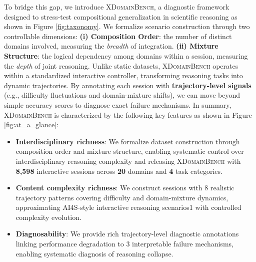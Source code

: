 To bridge this gap, we introduce \textsc{XDomainBench}, a diagnostic framework designed to stress-test compositional generalization in scientific reasoning as shown in Figure \ref{fig:taxonomy}.
We formalize scenario construction through two controllable dimensions: 
\textbf{(i) Composition Order}: the number of distinct domains involved, measuring the \textit{breadth} of integration.
\textbf{(ii) Mixture Structure}: the logical dependency among domains within a session, measuring the \textit{depth} of joint reasoning.
Unlike static datasets, \textsc{XDomainBench} operates within a standardized interactive controller, transforming reasoning tasks into dynamic trajectories.
% 
By annotating each session with \textbf{trajectory-level signals} (e.g., difficulty fluctuations and domain-mixture shifts), we can move beyond simple accuracy scores to diagnose exact failure mechanisms. 
In summary, \textsc{XDomainBench} is characterized by the following key features as shown in Figure \ref{fig:at_a_glance}:
\begin{itemize}
    \item \textbf{Interdisciplinary richness}: We formalize dataset construction through composition order and mixture structure, enabling systematic control over interdisciplinary reasoning complexity and releasing \textsc{XDomainBench} with \textbf{8,598} interactive sessions across \textbf{20} domains and \textbf{4} task categories.
    \item \textbf{Content complexity richness}: We construct sessions with 8 realistic trajectory patterns covering difficulty and domain-mixture dynamics, approximating AI4S-style interactive reasoning scenarios1 with controlled complexity evolution.
    \item \textbf{Diagnosability}: We provide rich trajectory-level diagnostic annotations linking performance degradation to 3 interpretable failure mechanisms, enabling systematic diagnosis of reasoning collapse.
\end{itemize}


